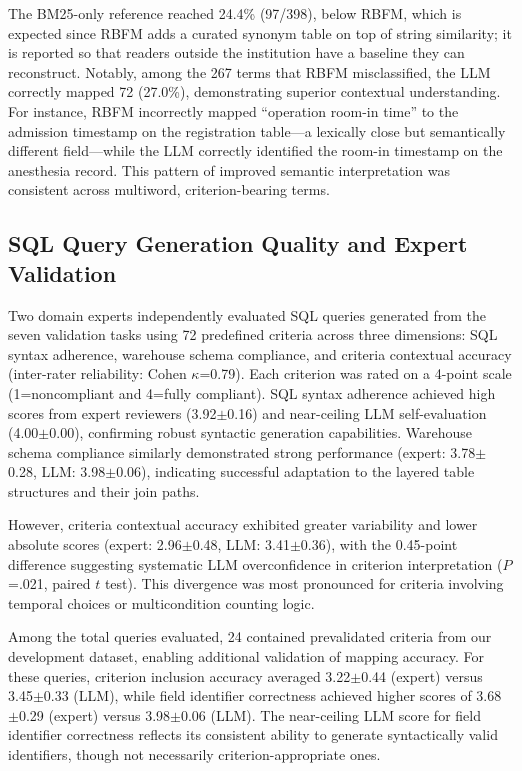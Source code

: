 \documentclass[applsci,article,submit,pdftex,oneauthor]{Definitions/mdpi}
\begin{document}
The BM25-only reference reached 24.4\% (97/398), below RBFM, which is expected since RBFM adds a curated synonym table on top of string similarity; it is reported so that readers outside the institution have a baseline they can reconstruct. Notably, among the 267 terms that RBFM misclassified, the LLM correctly mapped 72 (27.0\%), demonstrating superior contextual understanding. For instance, RBFM
incorrectly mapped ``operation room-in time'' to the admission timestamp on the
registration table---a lexically close but semantically different field---while
the LLM correctly identified the room-in timestamp on the anesthesia record.
This pattern of improved semantic interpretation was consistent across
multiword, criterion-bearing terms.

\subsection{SQL Query Generation Quality and Expert Validation}
Two domain experts independently evaluated SQL queries generated from the seven
validation tasks using 72 predefined criteria across three dimensions: SQL
syntax adherence, warehouse schema compliance, and criteria contextual accuracy
(inter-rater reliability: Cohen $\kappa$=0.79). Each criterion was rated on a
4-point scale (1=noncompliant and 4=fully compliant). SQL syntax adherence
achieved high scores from expert reviewers (3.92$\pm$0.16) and near-ceiling LLM self-evaluation (4.00$\pm$0.00), confirming robust syntactic generation
capabilities. Warehouse schema compliance similarly demonstrated strong
performance (expert: 3.78$\pm$0.28, LLM: 3.98$\pm$0.06), indicating successful
adaptation to the layered table structures and their join paths.

However, criteria contextual accuracy exhibited greater variability and lower
absolute scores (expert: 2.96$\pm$0.48, LLM: 3.41$\pm$0.36), with the 0.45-point difference suggesting systematic LLM overconfidence in criterion
interpretation ($P$=.021, paired $t$ test). This divergence was most pronounced
for criteria involving temporal choices or multicondition counting logic.

Among the total queries evaluated, 24 contained prevalidated criteria from our
development dataset, enabling additional validation of mapping accuracy. For
these queries, criterion inclusion accuracy averaged 3.22$\pm$0.44 (expert) versus 3.45$\pm$0.33 (LLM), while field identifier correctness achieved higher scores of 3.68$\pm$0.29 (expert) versus 3.98$\pm$0.06 (LLM).
The near-ceiling LLM score for field identifier correctness reflects its consistent
ability to generate syntactically valid identifiers, though not necessarily
criterion-appropriate ones.
\end{document}
